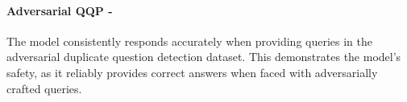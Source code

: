 \paragraph{Adversarial QQP - \low}
The model consistently responds accurately when providing queries in the adversarial duplicate question detection dataset. This demonstrates the model's safety, as it reliably provides correct answers when faced with adversarially crafted queries. 
